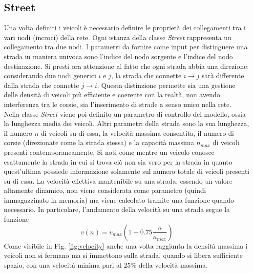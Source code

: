 \documentclass[../main.tex]{subfiles}un
\begin{document}
\subsection{Street}
Una volta definiti i veicoli \`e necessario definire le proprietà dei collegamenti tra i vari nodi (incroci) della rete.
Ogni istanza della classe \emph{Street} rappresenta un collegamento tra due nodi.
I parametri da fornire come input per distinguere una strada in maniera univoca sono l'indice del nodo sorgente e l'indice del nodo destinazione.
Si presti ora attenzione al fatto che ogni strada abbia una direzione: considerando due nodi generici $i$ e $j$, la strada che connette $i\to j$ sarà differente dalla strada che connette $j \to i$.
Questa distinzione permette sia una gestione delle densità di veicoli più efficiente e coerente con la realtà, non avendo interferenza tra le corsie, sia l'inserimento di strade a senso unico nella rete.\\
Nella classe \emph{Street} viene poi definito un parametro di controllo del modello, ossia la lunghezza media dei veicoli.
Altri parametri della strada sono la sua lunghezza, il numero $n$ di veicoli su di essa, la velocità massima consentita, il numero di corsie (direzionate come la strada stessa) e la capacità massima $n_{max}$ di veicoli presenti contemporaneamente.
Si noti come mentre un veicolo conosce esattamente la strada in cui si trova ciò non sia vero per la strada in quanto quest'ultima possiede informazione solamente sul numero totale di veicoli presenti su di essa.
La velocità effettiva mantenibile su una strada, essendo un valore altamente dinamico, non viene considerata come parametro (quindi immagazzinato in memoria) ma viene calcolato tramite una funzione quando necessario.
In particolare, l'andamento della velocità su una strada segue la funzione
\begin{equation}
    v(n)=v_{max}\left(1-0.75\frac{n}{n_{max}}\right)
    \label{equation:velocity}
\end{equation}
Come visibile in Fig. \ref{fig:velocity} anche una volta raggiunta la densità massima i veicoli non si fermano ma si immettono sulla strada, quando si libera sufficiente spazio, con una velocità minima pari al $25\%$ della velocità massima.
\end{document}
